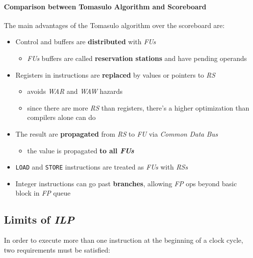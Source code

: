 \documentclass[english]{article}
\begin{document}
\paragraph{Comparison between Tomasulo Algorithm and Scoreboard}

The main advantages of the Tomasulo algorithm over the scoreboard are:

\begin{itemize}
  \item Control and buffers are \textbf{distributed} with \textit{FUs}
        \begin{itemize}
          \item \textit{FUs} buffers are called \textbf{reservation stations} and have pending operands
        \end{itemize}
  \item Registers in instructions are \textbf{replaced} by values or pointers to \textit{RS}
        \begin{itemize}
          \item avoids \textit{WAR} and \textit{WAW} hazards
          \item since there are more \textit{RS} than registers, there's a higher optimization than compilers alone can do
        \end{itemize}
  \item The result are \textbf{propagated} from \textit{RS} to \textit{FU} via \textit{Common Data Bus}
        \begin{itemize}
          \item the value is propagated \textbf{to all \textit{FUs}}
        \end{itemize}
  \item \texttt{LOAD} and \texttt{STORE} instructions are treated as \textit{FUs} with \textit{RSs}
  \item Integer instructions can go past \textbf{branches}, allowing \textit{FP} ops beyond basic block in \textit{FP} queue
\end{itemize}

\subsection{Limits of \textit{ILP}}

In order to execute more than one instruction at the beginning of a clock cycle, two requirements must be satisfied:
\end{document}
